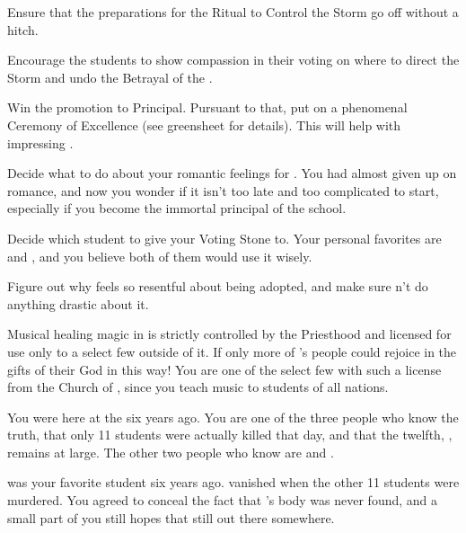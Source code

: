 \documentclass[char]{GL2020}
\begin{document}
\begin{itemz}
    \item Ensure that the preparations for the Ritual to Control the Storm go off without a hitch.
    \item Encourage the students to show compassion in their voting on where to direct the Storm and undo the Betrayal of the \pShip{}.
    \item Win the promotion to Principal. Pursuant to that, put on a phenomenal Ceremony of Excellence (see greensheet for details). This will help with impressing \cPrincipal{}.
    \item Decide what to do about your romantic feelings for \cFlowPriest{}. You had almost given up on romance, and now you wonder if it isn’t too late and too complicated to start, especially if you become the immortal principal of the school.
    \item Decide which student to give your Voting Stone to. Your personal favorites are \cAdopted{} and \cDisney{}, and you believe both of them would use it wisely.
    \item Figure out why \cAdopted{} feels so resentful about being adopted, and make sure \cAdopted{\they} \cAdopted{\do}n't do anything drastic about it.
\end{itemz}

\begin{itemz}[Notes]
    \item Musical healing magic in \pFarm{} is strictly controlled by the Priesthood and licensed for use only to a select few outside of it. If only more of \cFarmGod{}'s people could rejoice in the gifts of their God in this way! You are one of the select few with such a license from the Church of \cFarmGod{}, since you teach music to students of all nations.
    \item You were here at the \pSchool{} six years ago. You are one of the three people who know the truth, that only 11 students were actually killed that day, and that the twelfth, \cKidScientist{\full}, remains at large. The other two people who know are \cDiplomat{\full} and \cPrincipal{\full}.
    \item \cKidScientist{\full} was your favorite student six years ago. \cKidScientist{\They} vanished when the other 11 students were murdered. You agreed to conceal the fact that \cKidScientist{}'s body was never found, and a small part of you still hopes that \cKidScientist{\they} \cKidScientist{\are} still out there somewhere.
\end{itemz}
\end{document}
